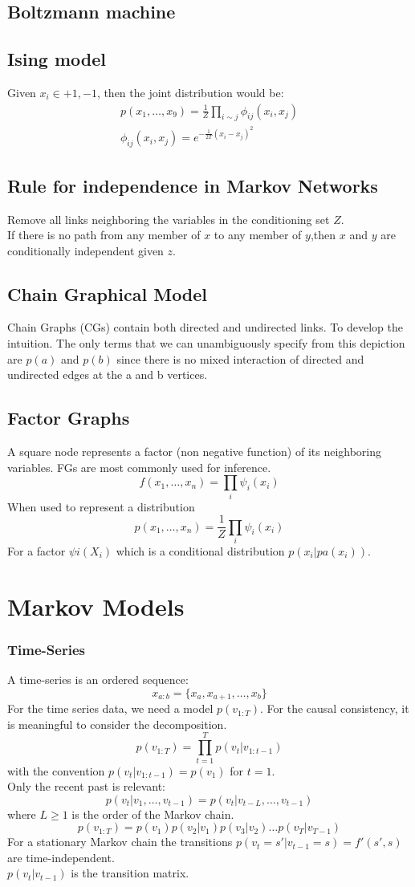 \documentclass[12pt,a4paper]{article}
\begin{document}
\subsection*{Boltzmann machine}

\subsection*{Ising model}
Given $x_i\in {+1,-1}$, then the joint distribution would be:
\begin{eqnarray*}
p(x_1,\ldots,x_9)=\frac{1}{Z}\prod_{i\sim j}\phi_{ij}(x_i,x_j)\\
\phi_{ij}(x_i,x_j) = e^{-\frac{1}{2T}(x_i-x_j)^2}
\end{eqnarray*}
\subsection*{Rule for independence in Markov Networks}
Remove all links neighboring the variables in the conditioning set $Z$.\\
If there is no path from any member of $x$ to any member of $y$,then $x$ and $y$ are conditionally independent given $z$.
\subsection*{Chain Graphical Model}
Chain Graphs (CGs) contain both directed and undirected links. To develop the intuition.
The only terms that we can unambiguously specify from this depiction are $p(a)$ and $p(b)$ since there is no
mixed interaction of directed and undirected edges at the a and b vertices. 
\subsection*{Factor Graphs}
A square node represents a factor (non negative function) of its neighboring variables. FGs are most commonly used for inference.
$$
f(x_1,\ldots,x_n) = \prod_{i}\psi_i(x_i)
$$
When used to represent a distribution
$$
p(x_1,\ldots,x_n) = \frac{1}{Z}\prod_{i}\psi_i(x_i)
$$
For a factor $\psi{i}(X_i)$ which is a conditional distribution $p(x_i|pa(x_i))$.
\section*{Markov Models}
\subsubsection*{Time-Series}
A time-series is an ordered sequence:
$$
x_{a:b}=\{x_a,x_{a+1},\ldots,x_b\}
$$
For the time series data, we need a model $p(v_{1:T})$. For the causal consistency, it is meaningful to consider the decomposition.
$$
p(v_{1:T}) = \prod_{t=1}^{T}p(v_t|v_{1:t-1})
$$
with the convention $p(v_t|v_{1:t-1}) = p(v_1)$ for $t=1$.\\
Only the recent past is relevant:
$$
p(v_t|v_1,\ldots,v_{t-1}) = p(v_t|v_{t-L},\ldots,v_{t-1})
$$
where $L\ge 1$ is the order of the Markov chain.
$$
p(v_{1:T}) = p(v_1)p(v_2|v_1)p(v_3|v_2)\ldots p(v_T|v_{T-1})
$$
For a stationary Markov chain the transitions $p(v_t=s'|v_{t-1}=s)=f'(s',s)$ are time-independent.\\
$p(v_t|v_{t-1})$ is the transition matrix.\\
\end{document}
